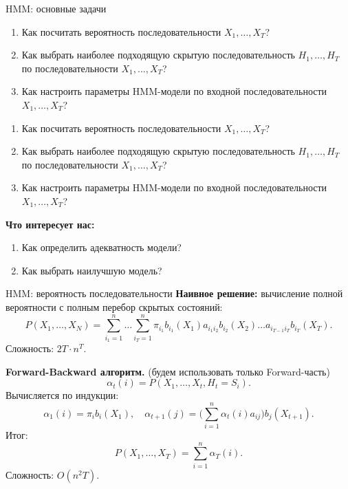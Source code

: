 \begin{frame}{HMM: основные задачи}
{
\begin{enumerate}
\item Как посчитать вероятность последовательности $X_1, \dots, X_T$?
\item Как выбрать наиболее подходящую скрытую последовательность $H_1,\dots, H_T$ по последовательности $X_1, \dots, X_T$?
\item Как настроить параметры HMM-модели по входной последовательности $X_1, \dots, X_T$?
\end{enumerate}
}
{
\begin{enumerate}
\item Как посчитать вероятность последовательности $X_1, \dots, X_T$?
\item Как выбрать наиболее подходящую скрытую последовательность $H_1,\dots, H_T$ по последовательности $X_1, \dots, X_T$?
\item Как настроить параметры HMM-модели по входной последовательности $X_1, \dots, X_T$?
\end{enumerate}
\textbf{Что интересует нас:}
\begin{enumerate}
\item Как определить адекватность модели?
\item Как выбрать наилучшую модель?
\end{enumerate}
}

\end{frame}
\iffalse

\begin{frame}{HMM: вероятность последовательности}
\textbf{Наивное решение:}  вычисление полной вероятности с полным перебор скрытых состояний:
\[
    P(X_1,\dots,X_N) = \sum_{i_1=1}^n\dots\sum_{i_T=1}^n\pi_{i_1}b_{i_1}(X_1)a_{i_1 i_2}b_{i_2}(X_2)\dots a_{i_{T-1} i_T} b_{i_T}(X_T).
\]
Сложность: $2T\cdot n^T$.

\textbf{Forward-Backward алгоритм.} (будем использовать только Forward-часть)\\
\[
    \alpha_t(i) = P(X_1,\dots,X_t, H_t = S_i).
\] 
Вычисляется по индукции:
\[
\alpha_1(i) = \pi_i b_i(X_1), \quad \alpha_{t+1}(j) = \bigl(\sum_{i=1}^n \alpha_t(i)a_{ij}\bigr)b_j(X_{t+1}).
\]
Итог:
\[
  P(X_1,\dots,X_T) = \sum_{i=1}^n \alpha_T(i).  
\]
Сложность: $O(n^2T)$.
\end{frame}


